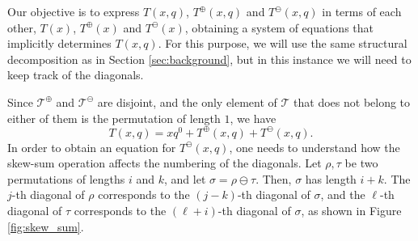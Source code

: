 \documentclass{article}
\theoremstyle{plain}
\theoremstyle{definition}
\theoremstyle{plain}
\begin{document}
Our objective is to express $T(x,q)$, $T^\oplus(x,q)$ and $T^\ominus(x,q)$ in
terms of each other, $T(x)$, $T^\oplus(x)$ and $T^\ominus(x)$, obtaining a
system of equations that implicitly determines $T(x,q)$. For this purpose, we
will use the same structural decomposition as in Section \ref{sec:background},
but in this instance we will need to keep track of the diagonals.

Since $\mathcal{T}^\oplus$ and $\mathcal{T}^\ominus$ are disjoint, and the only element of $\mathcal{T}$ that does not belong to either of them is the permutation of length $1$, we have
\begin{equation}\label{eq:separable}
    T(x,q) = xq^0 + T^\oplus(x,q) + T^\ominus(x,q).
\end{equation}
In order to obtain an equation for $T^\ominus(x,q)$, one needs to understand how the skew-sum operation affects the numbering of the diagonals. Let $\rho,\tau$ be two permutations of lengths $i$ and $k$, and let $\sigma = \rho\ominus\tau$. Then, $\sigma$ has length $i + k$. The $j$-th diagonal of $\rho$ corresponds to the $(j - k)$-th diagonal of $\sigma$, and the $\ell$-th diagonal of $\tau$ corresponds to the $(\ell + i)$-th diagonal of $\sigma$, as shown in Figure \ref{fig:skew_sum}.
\end{document}
